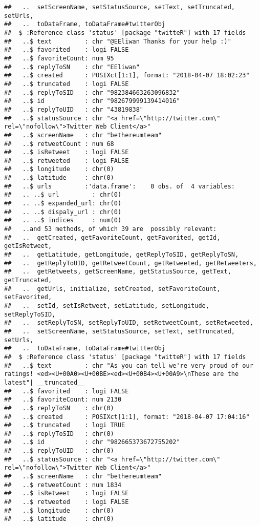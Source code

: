 \documentclass[]{article}
\begin{document}
\begin{verbatim}
##   ..  setScreenName, setStatusSource, setText, setTruncated, setUrls,
##   ..  toDataFrame, toDataFrame#twitterObj
##  $ :Reference class 'status' [package "twitteR"] with 17 fields
##   ..$ text         : chr "@EEliwan Thanks for your help :)"
##   ..$ favorited    : logi FALSE
##   ..$ favoriteCount: num 95
##   ..$ replyToSN    : chr "EEliwan"
##   ..$ created      : POSIXct[1:1], format: "2018-04-07 18:02:23"
##   ..$ truncated    : logi FALSE
##   ..$ replyToSID   : chr "982384663263096832"
##   ..$ id           : chr "982679999139414016"
##   ..$ replyToUID   : chr "43819838"
##   ..$ statusSource : chr "<a href=\"http://twitter.com\" rel=\"nofollow\">Twitter Web Client</a>"
##   ..$ screenName   : chr "bethereumteam"
##   ..$ retweetCount : num 68
##   ..$ isRetweet    : logi FALSE
##   ..$ retweeted    : logi FALSE
##   ..$ longitude    : chr(0) 
##   ..$ latitude     : chr(0) 
##   ..$ urls         :'data.frame':    0 obs. of  4 variables:
##   .. ..$ url         : chr(0) 
##   .. ..$ expanded_url: chr(0) 
##   .. ..$ dispaly_url : chr(0) 
##   .. ..$ indices     : num(0) 
##   ..and 53 methods, of which 39 are  possibly relevant:
##   ..  getCreated, getFavoriteCount, getFavorited, getId, getIsRetweet,
##   ..  getLatitude, getLongitude, getReplyToSID, getReplyToSN,
##   ..  getReplyToUID, getRetweetCount, getRetweeted, getRetweeters,
##   ..  getRetweets, getScreenName, getStatusSource, getText, getTruncated,
##   ..  getUrls, initialize, setCreated, setFavoriteCount, setFavorited,
##   ..  setId, setIsRetweet, setLatitude, setLongitude, setReplyToSID,
##   ..  setReplyToSN, setReplyToUID, setRetweetCount, setRetweeted,
##   ..  setScreenName, setStatusSource, setText, setTruncated, setUrls,
##   ..  toDataFrame, toDataFrame#twitterObj
##  $ :Reference class 'status' [package "twitteR"] with 17 fields
##   ..$ text         : chr "As you can tell we're very proud of our ratings! <ed><U+00A0><U+00BE><ed><U+00B4><U+00A9>\nThese are the latest"| __truncated__
##   ..$ favorited    : logi FALSE
##   ..$ favoriteCount: num 2130
##   ..$ replyToSN    : chr(0) 
##   ..$ created      : POSIXct[1:1], format: "2018-04-07 17:04:16"
##   ..$ truncated    : logi TRUE
##   ..$ replyToSID   : chr(0) 
##   ..$ id           : chr "982665373672755202"
##   ..$ replyToUID   : chr(0) 
##   ..$ statusSource : chr "<a href=\"http://twitter.com\" rel=\"nofollow\">Twitter Web Client</a>"
##   ..$ screenName   : chr "bethereumteam"
##   ..$ retweetCount : num 1834
##   ..$ isRetweet    : logi FALSE
##   ..$ retweeted    : logi FALSE
##   ..$ longitude    : chr(0) 
##   ..$ latitude     : chr(0) 

\end{verbatim}
\end{document}
